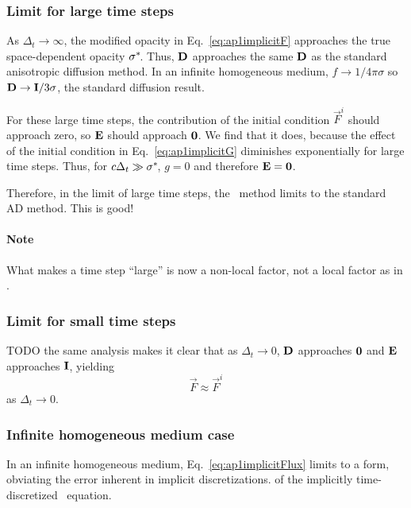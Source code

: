 \subsubsection{Limit for large time steps}
As $\Delta_t\to \infty$, the modified opacity in Eq.~\eqref{eq:ap1implicitF}
approaches the true space-dependent opacity $\sigma^{*\!}$. Thus, $\mathbf{D}$
approaches the same $\mathbf{D}$ as the standard anisotropic diffusion method. In
an infinite homogeneous medium, $f\to 1/4\pi \sigma$ so $\mathbf{D} \to
\mathbf{I}/3\sigma$, the standard diffusion result.

For these large time steps, the contribution of the initial condition
$\vec{F}^i$ should approach zero, so $\mathbf{E}$ should approach $
\mathbf{0}$. We find that it does, because the effect of the initial condition
in Eq.~\eqref{eq:ap1implicitG} diminishes exponentially for large time steps. Thus,
for $c \Delta_t \gg \sigma^{*\!}$, $g=0$ and therefore
$\mathbf{E}=\mathbf{0}$.

Therefore, in the limit of large time steps, the \APone\ method limits to the
standard AD method. This is good!

\paragraph{Note} What makes a time step ``large'' is now a non-local factor,
not a local factor as in \Pone.

\subsubsection{Limit for small time steps}
TODO the same analysis makes it clear that as $\Delta_t \to 0$,
$\mathbf{D}$ approaches $\mathbf{0}$ and $\mathbf{E}$ approaches $\mathbf{I}$,
yielding
\begin{equation*}
  \vec{F} \approx \vec{F}^i
\end{equation*}
as $\Delta_t \to 0$.

\subsubsection{Infinite homogeneous medium case}
In an infinite homogeneous medium, Eq.~\eqref{eq:ap1implicitFlux} limits to a
form, obviating the error inherent in implicit discretizations.
of the implicitly time-discretized \Pone\ equation.

